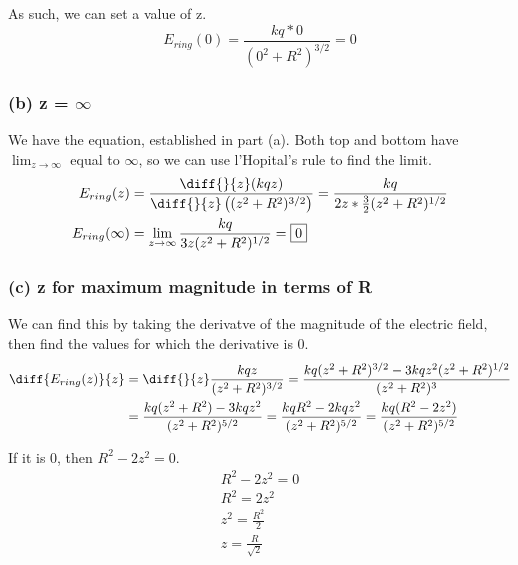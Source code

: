 \documentclass[12pt]{article}
\begin{document}
As such, we can set a value of z.
\begin{equation*}
    E_{ring}(0) =   \frac{kq*0}{(0^2 + R^2)^{3/2}}
        =   \boxed{0}
\end{equation*}

\subsubsection*{(b) z = $\infty$}
We have the equation, established in part (a). Both top and bottom have $\lim_{z\rightarrow\infty}$ equal to $\infty$, so we can use l'Hopital's rule to find the limit.
\begin{align*}
    E_{ring}(z) &=  \frac{\diff{}{z}(kqz)}{\diff{}{z}\left((z^2 + R^2)^{3/2}\right)}
        =   \frac{kq}{2z * \frac{3}{2}(z^2 + R^2)^{1/2}}\\
    E_{ring}(\infty)    &=  \lim_{z\rightarrow\infty} \frac{kq}{3z (z^2 + R^2)^{1/2}}
        =   \boxed{0}
\end{align*}

\pagebreak
\subsubsection*{(c) z for maximum magnitude in terms of R}
We can find this by taking the derivatve of the magnitude of the electric field, then find the values for which the derivative is 0.
\begin{align*}
    \diff{E_{ring}(z)}{z}   &=  \diff{}{z}\frac{kqz}{(z^2 + R^2)^{3/2}}
        =   \frac{kq(z^2 + R^2)^{3/2} - 3kqz^2 (z^2 + R^2)^{1/2}}{(z^2 + R^2)^{3}}\\
        &=  \frac{kq(z^2 + R^2) - 3kqz^2}{(z^2 + R^2)^{5/2}}
        =   \frac{kqR^2 - 2kqz^2}{(z^2 + R^2)^{5/2}}
        =   \frac{kq(R^2 - 2z^2)}{(z^2 + R^2)^{5/2}}
\end{align*}

If it is 0, then \(R^2 - 2z^2 = 0\).
\begin{gather*}
    R^2 - 2z^2 = 0\\
    R^2 =   2z^2\\
    z^2 =   \frac{R^2}{2}\\
    \boxed{z   =   \frac{R}{\sqrt{2}}}
\end{gather*}
\end{document}
